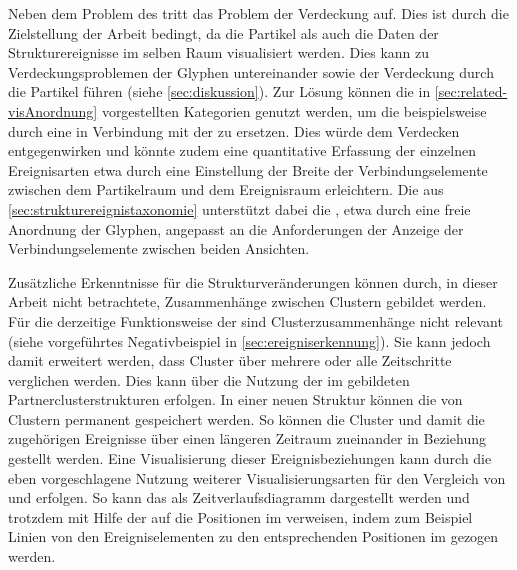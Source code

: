 Neben dem Problem des  tritt das Problem der Verdeckung auf. Dies ist durch die Zielstellung der Arbeit bedingt, da die Partikel als auch die Daten der Strukturereignisse im selben Raum visualisiert werden. Dies kann zu Verdeckungsproblemen der Glyphen untereinander sowie der Verdeckung durch die Partikel führen (siehe \autoref{sec:diskussion}). Zur Lösung können die in \autoref{sec:related-visAnordnung} vorgestellten Kategorien genutzt werden, um die  beispielsweise durch eine  in Verbindung mit der  zu ersetzen. Dies würde dem Verdecken entgegenwirken und könnte zudem eine quantitative Erfassung der einzelnen Ereignisarten etwa durch eine Einstellung der Breite der Verbindungselemente zwischen dem Partikelraum und dem Ereignisraum erleichtern. Die  aus \autoref{sec:strukturereignistaxonomie} unterstützt dabei die , etwa durch eine freie Anordnung der Glyphen, angepasst an die Anforderungen der Anzeige der Verbindungselemente zwischen beiden Ansichten.

Zusätzliche Erkenntnisse für die Strukturveränderungen können durch, in dieser Arbeit nicht betrachtete, Zusammenhänge zwischen Clustern gebildet werden. Für die derzeitige Funktionsweise der  sind Clusterzusammenhänge nicht relevant (siehe vorgeführtes Negativbeispiel in \autoref{sec:ereigniserkennung}). Sie kann jedoch damit erweitert werden, dass Cluster über mehrere oder alle Zeitschritte verglichen werden. Dies kann über die Nutzung der im \SECC gebildeten Partnerclusterstrukturen erfolgen. In einer neuen Struktur können die  von Clustern permanent gespeichert werden. So können die Cluster und damit die zugehörigen Ereignisse über einen längeren Zeitraum zueinander in Beziehung gestellt werden. Eine Visualisierung dieser Ereignisbeziehungen kann durch die eben vorgeschlagene Nutzung weiterer Visualisierungsarten für den Vergleich von  und  erfolgen. So kann das  als Zeitverlaufsdiagramm dargestellt werden und trotzdem mit Hilfe der  auf die Positionen im  verweisen, indem zum Beispiel Linien von den Ereigniselementen zu den entsprechenden Positionen im  gezogen werden.
	
	
